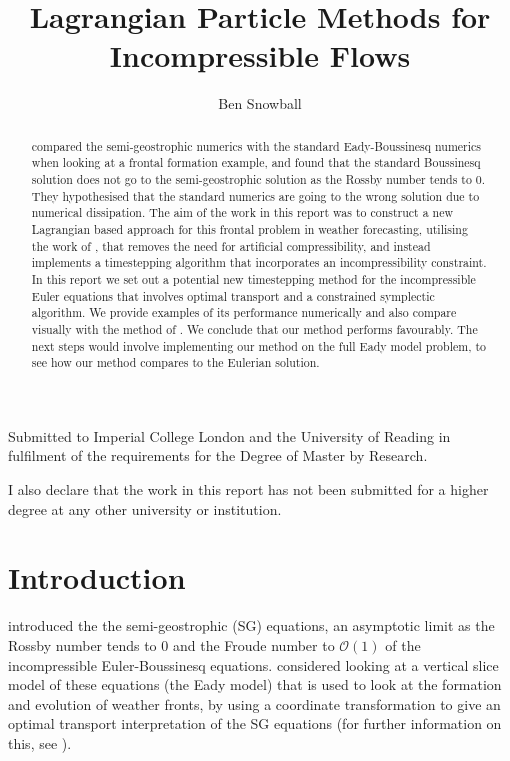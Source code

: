 \documentclass[11pt, oneside]{article}   	%
\title{Lagrangian Particle Methods for Incompressible Flows}
\author{Ben Snowball}
\begin{document}
\maketitle

Submitted to Imperial College London and the University of Reading in fulfilment of the requirements for the Degree of Master by Research.

I also declare that the work in this report has not been submitted for a higher degree at any other university or institution.

\newpage
\begin{abstract}
\cite{visram2014framework} compared the semi-geostrophic numerics with the standard Eady-Boussinesq numerics when looking at a frontal formation example, and found that the standard Boussinesq solution does not go to the semi-geostrophic solution as the Rossby number tends to \(0\). They hypothesised that the standard numerics are going to the wrong solution due to numerical dissipation. The aim of the work in this report was to construct a new Lagrangian based approach for this frontal problem in weather forecasting, utilising the work of \cite{gallouet2016lagrangian}, that removes the need for artificial compressibility, and instead implements a timestepping algorithm that incorporates an incompressibility constraint. In this report we set out a potential new timestepping method for the incompressible Euler equations that involves optimal transport and a constrained symplectic algorithm. We provide examples of its performance numerically and also compare visually with the method of \cite{gallouet2016lagrangian}. We conclude that our method performs favourably. The next steps would involve implementing our method on the full Eady model problem, to see how our method compares to the  Eulerian solution.
\end{abstract}


\newpage
\tableofcontents

\newpage
\section{Introduction}

\cite{hoskins1971atmospheric} introduced the the semi-geostrophic (SG) equations, an asymptotic limit as the Rossby number tends to \(0\) and the Froude number to \(\mathcal{O}(1)\) of the incompressible Euler-Boussinesq equations. \cite{shutts1987parcel} considered looking at a vertical slice model of these equations (the Eady model) that is used to look at the formation and evolution of weather fronts, by using a coordinate transformation to give an optimal transport interpretation of the SG equations (for further information on this, see \cite{cullen2006mathematical}).
\end{document}
